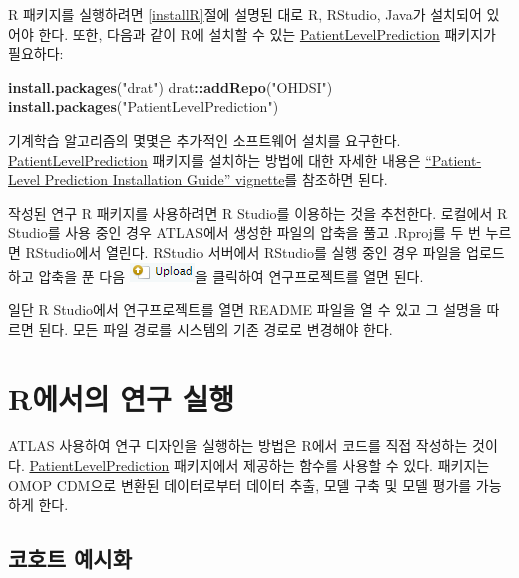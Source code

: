\documentclass[10.5pt]{book}
\newenvironment{Shaded}{\begin{snugshade}}{\end{snugshade}}
\newcommand{\KeywordTok}[1]{\textcolor[rgb]{0.13,0.29,0.53}{\textbf{#1}}}
\newcommand{\StringTok}[1]{\textcolor[rgb]{0.31,0.60,0.02}{#1}}
\newcommand{\OperatorTok}[1]{\textcolor[rgb]{0.81,0.36,0.00}{\textbf{#1}}}
\newcommand{\NormalTok}[1]{#1}
\theoremstyle{definition}
\theoremstyle{definition}
\theoremstyle{definition}
\theoremstyle{remark}
\begin{document}
R 패키지를 실행하려면 \ref{installR}절에 설명된 대로 R, RStudio, Java가
설치되어 있어야 한다. 또한, 다음과 같이 R에 설치할 수 있는
\href{https://ohdsi.github.io/PatientLevelPrediction/}{PatientLevelPrediction}
패키지가 필요하다:

\begin{Shaded}
\begin{Highlighting}[]
\KeywordTok{install.packages}\NormalTok{(}\StringTok{"drat"}\NormalTok{)}
\NormalTok{drat}\OperatorTok{::}\KeywordTok{addRepo}\NormalTok{(}\StringTok{"OHDSI"}\NormalTok{)}
\KeywordTok{install.packages}\NormalTok{(}\StringTok{"PatientLevelPrediction"}\NormalTok{)}
\end{Highlighting}
\end{Shaded}

기계학습 알고리즘의 몇몇은 추가적인 소프트웨어 설치를 요구한다.
\href{https://ohdsi.github.io/PatientLevelPrediction/}{PatientLevelPrediction}
패키지를 설치하는 방법에 대한 자세한 내용은
\href{https://ohdsi.github.io/PatientLevelPrediction/articles/InstallationGuide.html}{``Patient-Level
Prediction Installation Guide'' vignette}를 참조하면 된다.

작성된 연구 R 패키지를 사용하려면 R Studio를 이용하는 것을 추천한다.
로컬에서 R Studio를 사용 중인 경우 ATLAS에서 생성한 파일의 압축을 풀고
.Rproj를 두 번 누르면 RStudio에서 열린다. RStudio 서버에서 RStudio를
실행 중인 경우 파일을 업로드하고 압축을 푼 다음
\includegraphics{images/PopulationLevelEstimation/upload.png}을 클릭하여
연구프로젝트를 열면 된다.

일단 R Studio에서 연구프로젝트를 열면 README 파일을 열 수 있고 그 설명을
따르면 된다. 모든 파일 경로를 시스템의 기존 경로로 변경해야 한다.

\section{R에서의 연구 실행}\label{r--}

ATLAS 사용하여 연구 디자인을 실행하는 방법은 R에서 코드를 직접 작성하는
것이다.
\href{https://ohdsi.github.io/PatientLevelPrediction/}{PatientLevelPrediction}
패키지에서 제공하는 함수를 사용할 수 있다. 패키지는 OMOP CDM으로 변환된
데이터로부터 데이터 추출, 모델 구축 및 모델 평가를 가능하게 한다.

\subsection{코호트 예시화}\label{-}
\end{document}
